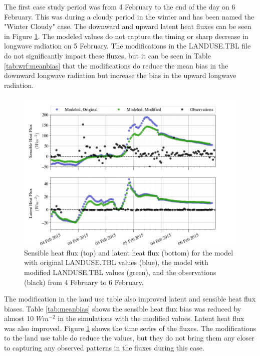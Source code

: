 {The first case study period was from 4 February to the end of the day on 6 February. This was during a cloudy period in the winter and has been named the "Winter Cloudy" case. The downward and upward latent heat fluxes can be seen in Figure \ref{fig:c1:heat}. The modeled values do not capture the timing or sharp decrease in longwave radiation on 5 February. The modifications in the LANDUSE.TBL file do not significantly impact these fluxes, but it can be seen in Table \ref{tab:wrf:meanbias} that the modifications do reduce the mean bias in the downward longwave radiation but increase the bias in the upward longwave radiation. 

\begin{figure}[h]
    \centering
    \includegraphics[width=1\linewidth]{figures/chapter6/case1_sensible_latent.png}
    \caption[Idealized Case 1 - Latent and sensible heat fluxes.]{Sensible heat flux (top) and latent heat flux (bottom) for the model with original LANDUSE.TBL values (blue), the model with modified LANDUSE.TBL values (green), and the observations (black) from 4 February to 6 February.}
    \label{fig:c1:heat}
\end{figure}

The modification in the land use table also improved latent and sensible heat flux biases. Table \ref{tab:meanbias} shows the sensible heat flux bias was reduced by almost 10 $Wm^{-2}$ in the simulations with the modified values. Latent heat flux was also improved. Figure \ref{fig:c1:heat} shows the time series of the fluxes. The modifications to the land use table do reduce the values, but they do not bring them any closer to capturing any observed patterns in the fluxes during this case.

}
